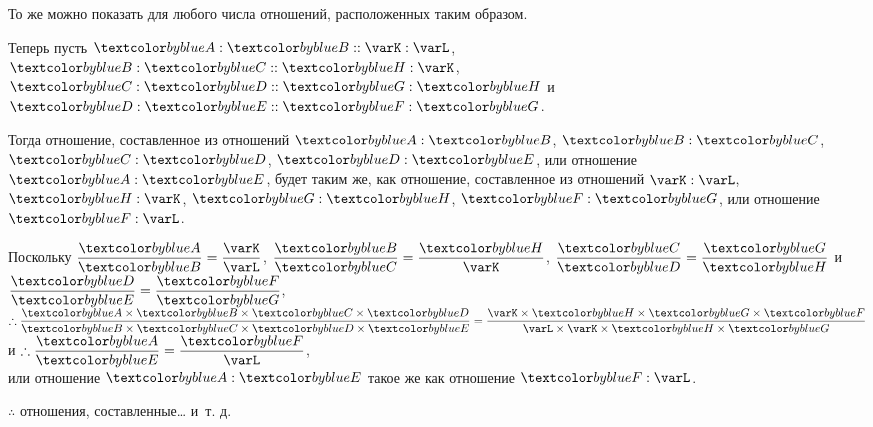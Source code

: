 \documentclass[letters,booklanguage=russian]{byrnebook}
\begin{document}
То же можно показать для любого числа отношений, расположенных таким образом.

\begin{center}
Теперь пусть $\varA : \varB :: \varK : \varL$, $\varB : \varC :: \varH : \varK$, $\varC : \varD :: \varG : \varH$ и $\varD : \varE :: \varF : \varG$.
\end{center}

Тогда отношение, составленное из отношений $\varA : \varB$, $\varB : \varC$, $\varC : \varD$, $\varD : \varE$, или отношение $\varA : \varE$, будет таким же, как отношение, составленное из отношений $\varK : \varL$, $\varH : \varK$, $\varG : \varH$, $\varF : \varG$, или отношение $\varF : \varL$.

\begin{center}
Поскольку $\dfrac{\varA}{\varB} = \dfrac{\varK}{\varL}$, $\dfrac{\varB}{\varC} = \dfrac{\varH}{\varK}$, $\dfrac{\varC}{\varD} = \dfrac{\varG}{\varH}$ и $\dfrac{\varD}{\varE} = \dfrac{\varF}{\varG}$,\\
$\therefore \dfrac{\varA \times \varB \times \varC \times \varD}{\varB \times \varC \times \varD \times \varE} = \dfrac{\varK \times \varH \times \varG \times \varF}{\varL \times \varK \times \varH \times \varG}$ и $\therefore \dfrac{\varA}{\varE} = \dfrac{\varF}{\varL}$,\\
или отношение $\varA : \varE$ такое же как отношение $\varF : \varL$.

$\therefore$ отношения, составленные… и~т. д.
\end{center}

\vfill\pagebreak

\label{prop:V.G}
\def\varA{\textcolor{byblue}{A}}
\def\varB{\textcolor{byblue}{B}}
\def\varC{\textcolor{byblue}{C}}
\def\varD{\textcolor{byblue}{D}}
\def\varE{\textcolor{byblue}{E}}
\def\varF{\textcolor{byblue}{F}}
\def\varG{\textcolor{byblue}{G}}
\def\varH{\textcolor{byblue}{H}}
\def\varP{\textcolor{byred}{P}}
\def\varQ{\textcolor{byred}{Q}}
\def\varR{\textcolor{byred}{R}}
\def\varS{\textcolor{byred}{S}}
\def\varT{\textcolor{byred}{T}}
\def\varV{\textcolor{byyellow}{V}}
\def\varW{\textcolor{byyellow}{W}}
\def\varX{\textcolor{byyellow}{X}}
\def\varY{\textcolor{byyellow}{Y}}
\def\varZ{\textcolor{byyellow}{Z}}
\end{document}
